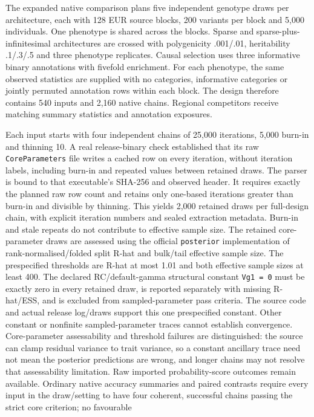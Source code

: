 \documentclass[
  british,
  10pt,
]{article}
\begin{document}
The expanded native comparison plans five independent genotype draws per
architecture, each with 128 EUR source blocks, 200 variants per block
and 5,000 individuals. One phenotype is shared across the blocks. Sparse
and sparse-plus-infinitesimal architectures are crossed with
polygenicity .001/.01, heritability .1/.3/.5 and three phenotype
replicates. Causal selection uses three informative binary annotations
with fivefold enrichment. For each phenotype, the same observed
statistics are supplied with no categories, informative categories or
jointly permuted annotation rows within each block. The design therefore
contains 540 inputs and 2,160 native chains. Regional competitors
receive matching summary statistics and annotation exposures.

Each input starts with four independent chains of 25,000 iterations,
5,000 burn-in and thinning 10. A real release-binary check established
that its raw \texttt{CoreParameters} file writes a cached row on every
iteration, without iteration labels, including burn-in and repeated
values between retained draws. The parser is bound to that executable's
SHA-256 and observed header. It requires exactly the planned raw row
count and retains only one-based iterations greater than burn-in and
divisible by thinning. This yields 2,000 retained draws per full-design
chain, with explicit iteration numbers and sealed extraction metadata.
Burn-in and stale repeats do not contribute to effective sample size.
The retained core-parameter draws are assessed using the official
\texttt{posterior} implementation of rank-normalised/folded split R-hat
and bulk/tail effective sample size. The prespecified thresholds are
R-hat at most 1.01 and both effective sample sizes at least 400. The
declared RC/default-gamma structural constant \texttt{Vg1\ =\ 0} must be
exactly zero in every retained draw, is reported separately with missing
R-hat/ESS, and is excluded from sampled-parameter pass criteria. The
source code and actual release log/draws support this one prespecified
constant. Other constant or nonfinite sampled-parameter traces cannot
establish convergence. Core-parameter assessability and threshold
failures are distinguished: the source can clamp residual variance to
trait variance, so a constant ancillary trace need not mean the
posterior predictions are wrong, and longer chains may not resolve that
assessability limitation. Raw imported probability-score outcomes remain
available. Ordinary native accuracy summaries and paired contrasts
require every input in the draw/setting to have four coherent,
successful chains passing the strict core criterion; no favourable
\end{document}
